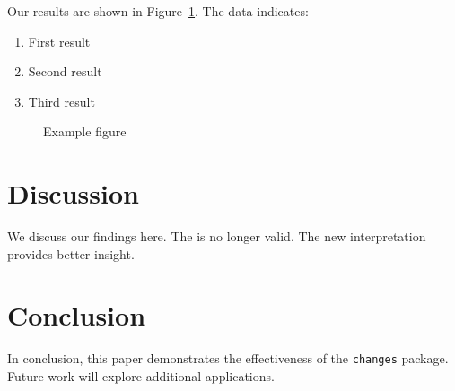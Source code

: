 \documentclass[12pt]{article}
\begin{document}
Our results are shown in Figure~\ref{fig:example}. The data indicates:
\begin{enumerate}
    \item First result
    \item Second result
    \item Third result
\end{enumerate}

\begin{figure}[h]
    \centering
    \caption{Example figure}
    \label{fig:example}
\end{figure}

\section{Discussion}
\label{sec:discussion}

We discuss our findings here. The  is no longer valid. The new interpretation provides better insight.

\section{Conclusion}
\label{sec:conclusion}

In conclusion, this paper demonstrates the effectiveness of the \texttt{changes} package. Future work will explore additional applications.



\end{document}
